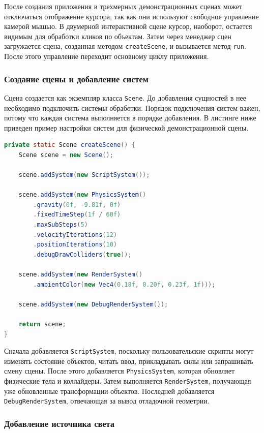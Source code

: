 После создания приложения в трехмерных демонстрационных сценах может отключаться отображение курсора, так как они используют свободное управление камерой мышью. В двумерной интерактивной сцене курсор, наоборот, остается видимым для обработки кликов по объектам. Затем через менеджер сцен загружается сцена, созданная методом \texttt{createScene}, и вызывается метод \texttt{run}. После этого управление переходит основному циклу приложения.

\subsubsection{Создание сцены и добавление систем}

Сцена создается как экземпляр класса \texttt{Scene}. До добавления сущностей в нее необходимо подключить системы обработки. Порядок подключения систем важен, потому что каждая система выполняется в порядке добавления. В листинге ниже приведен пример настройки систем для физической демонстрационной сцены.

\begin{lstlisting}[language=Java,caption={Создание сцены и подключение систем}]
private static Scene createScene() {
    Scene scene = new Scene();

    scene.addSystem(new ScriptSystem());

    scene.addSystem(new PhysicsSystem()
        .gravity(0f, -9.81f, 0f)
        .fixedTimeStep(1f / 60f)
        .maxSubSteps(5)
        .velocityIterations(12)
        .positionIterations(10)
        .debugDrawColliders(true));

    scene.addSystem(new RenderSystem()
        .ambientColor(new Vec4(0.18f, 0.20f, 0.23f, 1f)));

    scene.addSystem(new DebugRenderSystem());

    return scene;
}
\end{lstlisting}

Сначала добавляется \texttt{ScriptSystem}, поскольку пользовательские скрипты могут изменять состояние объектов, читать ввод, прикладывать силы или запрашивать смену сцены. После этого добавляется \texttt{PhysicsSystem}, которая обновляет физические тела и коллайдеры. Затем выполняется \texttt{RenderSystem}, получающая уже обновленные трансформации объектов. Последней добавляется \texttt{DebugRenderSystem}, отвечающая за вывод отладочной геометрии.

\subsubsection{Добавление источника света}

